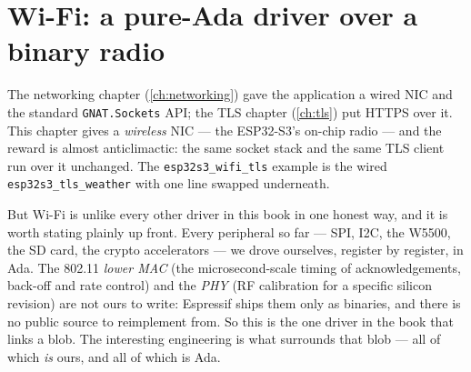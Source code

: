 \chapter{Wi-Fi: a pure-Ada driver over a binary radio}
\label{ch:wifi}

The networking chapter (\ref{ch:networking}) gave the application a wired NIC and
the standard \texttt{GNAT.Sockets} API; the TLS chapter (\ref{ch:tls}) put HTTPS
over it. This chapter gives a \emph{wireless} NIC --- the ESP32-S3's on-chip
radio --- and the reward is almost anticlimactic: the same socket stack and the
same TLS client run over it unchanged. The \texttt{esp32s3\_wifi\_tls} example is
the wired \texttt{esp32s3\_tls\_weather} with one line swapped underneath.

But Wi-Fi is unlike every other driver in this book in one honest way, and it is
worth stating plainly up front. Every peripheral so far --- SPI, I2C, the W5500,
the SD card, the crypto accelerators --- we drove ourselves, register by
register, in Ada. The 802.11 \emph{lower MAC} (the microsecond-scale timing of
acknowledgements, back-off and rate control) and the \emph{PHY} (RF calibration
for a specific silicon revision) are not ours to write: Espressif ships them only
as binaries, and there is no public source to reimplement from. So this is the
one driver in the book that links a blob. The interesting engineering is what
surrounds that blob --- all of which \emph{is} ours, and all of which is Ada.


